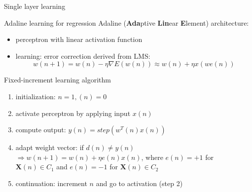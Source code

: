 \documentclass[9pt,t]{beamer}
\begin{document}
\begin{frame}{Single layer learning}
    \begin{alertblock}{Adaline learning for regression}
        Adaline (\textbf{Ada}ptive \textbf{Lin}ear \textbf{E}lement) architecture:
        \begin{itemize}
            \item perceptron with linear activation function
            \item learning: error correction derived from LMS:
            \[ w(n+1) = w(n) - \eta \nabla E(w(n)) \approx w(n) + \eta x(w e(n)) \]
        \end{itemize}
    \end{alertblock}
    \begin{alertblock}{Fixed-increment learning algorithm}
        \begin{enumerate}
            \item initialization: $ n = 1, (n) = 0 $
            \item activate perceptron by applying input $ x(n) $
            \item compute output: $ y(n) = step(w^T(n) x(n)) $
            \item adapt weight vector: if $ d(n) \neq y(n) $ $ \Rightarrow w(n+1) = w(n) + \eta e(n) x(n) $,
            where $ e(n) = +1 $ for $ \textbf{X}(n) \in C_1 $ and $ e(n) = -1 $ for $ \textbf{X}(n) \in C_2 $
            \item continuation: increment $n$ and go to activation (step 2)
        \end{enumerate}
    \end{alertblock}
\end{frame}
\end{document}
